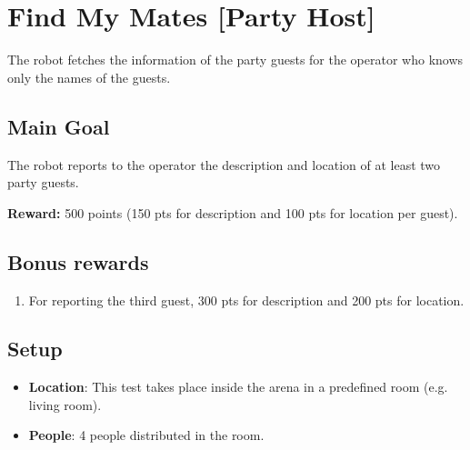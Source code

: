 \section{Find My Mates [Party Host]}

The robot fetches the information of the party guests for the operator who knows only the names of the guests.


\subsection{Main Goal}

The robot reports to the operator the description and location of at least two party guests.

\noindent\textbf{Reward:} 500 points (150 pts for description and 100 pts for location per guest).

\subsection{Bonus rewards}
\begin{enumerate}[nosep]
	\item For reporting the third guest, 300 pts for description and 200 pts for location.
\end{enumerate}


\subsection{Setup}
\begin{itemize}
	\item \textbf{Location}: This test takes place inside the arena in a predefined room (e.g. living room).

	\item \textbf{People}: 4 people distributed in the room.
\end{itemize}

